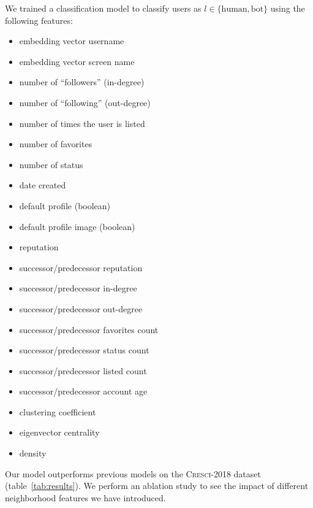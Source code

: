 We trained a classification model to classify users as $l \in \{\text{human},\text{bot}\}$ using the following features:

\begin{multicols}{2}
\begin{itemize}
    \item embedding vector username
    \item embedding vector screen name
    \item number of “followers” (in-degree)
    \item number of “following” (out-degree)
    \item number of times the user is listed
    \item number of favorites
    \item number of status
    \item date created
    \item default profile (boolean)
    \item default profile image (boolean)
    \item reputation
    \item successor/predecessor reputation
    \item successor/predecessor in-degree
    \item successor/predecessor out-degree
    \item successor/predecessor favorites count
    \item successor/predecessor status count
    \item successor/predecessor listed count
    \item successor/predecessor account age
    \item clustering coefficient
    \item eigenvector centrality
    \item density
\end{itemize}
\end{multicols}

\noindent Our model outperforms previous models on the \textsc{Cresci-2018} dataset (table~\ref{tab:results}). We perform an ablation study to see the impact of different neighborhood features we have introduced.


